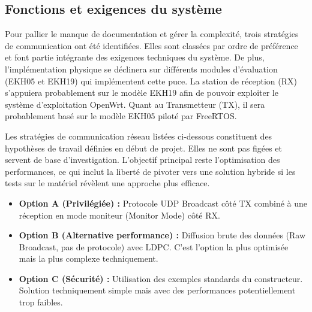 \subsection{Fonctions et exigences du système}
Pour pallier le manque de documentation et gérer la complexité, trois stratégies de 
communication ont été identifiées. Elles sont classées par ordre de préférence 
et font partie intégrante des exigences techniques du système. De plus, l'implémentation physique 
se déclinera sur différents modules d'évaluation (EKH05 et EKH19) qui implémentent cette puce.
La station de réception (RX) s'appuiera probablement sur le modèle EKH19 afin de pouvoir exploiter le système 
d'exploitation OpenWrt. Quant au Transmetteur (TX), il sera probablement basé sur le modèle EKH05 piloté par 
FreeRTOS.\newline

Les stratégies de communication réseau listées ci-dessous constituent des hypothèses de travail définies en début de 
projet. Elles ne sont pas figées et servent de base d'investigation. L'objectif principal reste l'optimisation des 
performances, ce qui inclut la liberté de pivoter vers une solution hybride si les tests sur le matériel révèlent 
une approche plus efficace.

\begin{itemize}
    \item \textbf{Option A (Privilégiée) :} Protocole UDP Broadcast côté TX
    combiné à une réception en mode moniteur (Monitor Mode) côté RX.
    \item \textbf{Option B (Alternative performance) :} Diffusion brute des données (Raw Broadcast, pas de protocole) 
    avec LDPC. C'est l'option la plus optimisée mais la plus complexe techniquement.
    \item \textbf{Option C (Sécurité) :} Utilisation des exemples standards du constructeur. Solution techniquement simple mais avec des performances potentiellement trop faibles.
\end{itemize}

\vspace{0.5cm}

